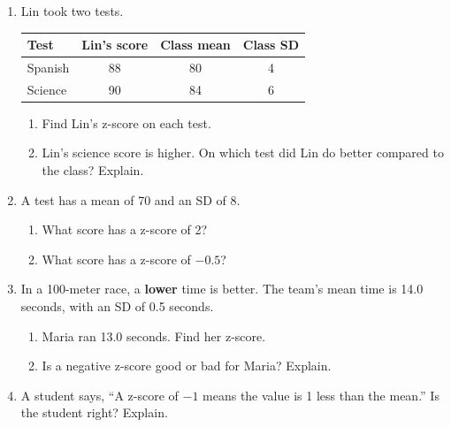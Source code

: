 \documentclass[11pt]{article}
\begin{document}
\begin{enumerate}
\newpage
\item Lin took two tests.

\begin{center}
\renewcommand{\arraystretch}{1.3}
\begin{tabular}{|l|c|c|c|}\hline
Test & Lin's score & Class mean & Class SD \\ \hline
Spanish & 88 & 80 & 4 \\ \hline
Science & 90 & 84 & 6 \\ \hline
\end{tabular}
\end{center}
\begin{enumerate}[itemsep=1.6em]
  \item Find Lin's z-score on each test. 
  \work{2em}
  \item Lin's science score is higher. On which test did Lin do better compared to the class? Explain.

\end{enumerate}
\work{2em}

\item A test has a mean of 70 and an SD of 8.
\begin{enumerate}[itemsep=1.6em]
  \item What score has a z-score of 2? 
  \item What score has a z-score of $-0.5$? 
\end{enumerate}
\work{1.5em}

\item In a 100-meter race, a \textbf{lower} time is better. The team's mean time is 14.0 seconds, with an SD of 0.5 seconds.
\begin{enumerate}[itemsep=1.6em]
  \item Maria ran 13.0 seconds. Find her z-score. 
  \item Is a negative z-score good or bad for Maria? Explain.

\end{enumerate}
\work{1.5em}

\item A student says, ``A z-score of $-1$ means the value is 1 less than the mean.'' Is the student right? Explain.


\end{enumerate}
\end{document}

